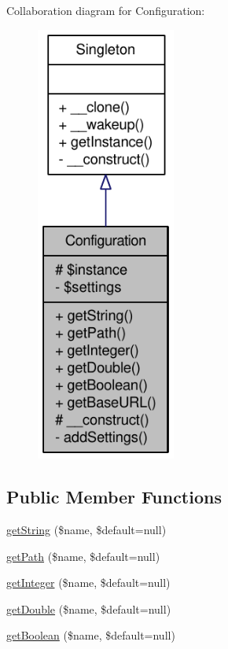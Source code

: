 Collaboration diagram for Configuration:\nopagebreak
\begin{figure}[H]
\begin{center}
\leavevmode
\includegraphics[width=130pt]{classConfiguration__coll__graph}
\end{center}
\end{figure}
\subsection*{Public Member Functions}
\begin{DoxyCompactItemize}
\item 
\hyperlink{classConfiguration_af83327cbd2812c84077aa8e92cc1f9b6}{getString} (\$name, \$default=null)
\item 
\hyperlink{classConfiguration_a71e55f600649d58321c039cbb829ea09}{getPath} (\$name, \$default=null)
\item 
\hyperlink{classConfiguration_a7aba0859f79226be3b942e11a1d33738}{getInteger} (\$name, \$default=null)
\item 
\hyperlink{classConfiguration_aadd8e90fd4915c74aabe8e88be9bfe58}{getDouble} (\$name, \$default=null)
\item 
\hyperlink{classConfiguration_a4afcc17b2a14fe90ca873fc7cbc38d16}{getBoolean} (\$name, \$default=null)
\end{DoxyCompactItemize}
